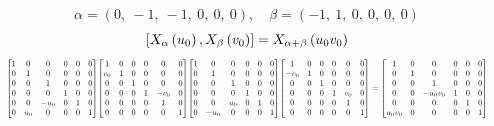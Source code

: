 \documentclass[11pt]{article}
\theoremstyle{definition}
\begin{document}
\[
\alpha = \left( 0, \  -1, \  -1, \  0, \  0, \  0\right), \quad \beta = \left( -1, \  1, \  0, \  0, \  0, \  0\right)
\]
\[
\scaletoalign{\textwidth}{\left[ X_{\alpha}\left(u_{0}\right), X_{\beta}\left(v_{0}\right) \right] = X_{\alpha + \beta}\left(u_{0} v_{0}\right)}
\]
\[
\scaletoalign{\textwidth}{{\left[\begin{matrix}1 & 0 & 0 & 0 & 0 & 0\\0 & 1 & 0 & 0 & 0 & 0\\0 & 0 & 1 & 0 & 0 & 0\\0 & 0 & 0 & 1 & 0 & 0\\0 & 0 & - u_{0} & 0 & 1 & 0\\0 & u_{0} & 0 & 0 & 0 & 1\end{matrix}\right]} {\left[\begin{matrix}1 & 0 & 0 & 0 & 0 & 0\\v_{0} & 1 & 0 & 0 & 0 & 0\\0 & 0 & 1 & 0 & 0 & 0\\0 & 0 & 0 & 1 & - v_{0} & 0\\0 & 0 & 0 & 0 & 1 & 0\\0 & 0 & 0 & 0 & 0 & 1\end{matrix}\right]} {\left[\begin{matrix}1 & 0 & 0 & 0 & 0 & 0\\0 & 1 & 0 & 0 & 0 & 0\\0 & 0 & 1 & 0 & 0 & 0\\0 & 0 & 0 & 1 & 0 & 0\\0 & 0 & u_{0} & 0 & 1 & 0\\0 & - u_{0} & 0 & 0 & 0 & 1\end{matrix}\right]} {\left[\begin{matrix}1 & 0 & 0 & 0 & 0 & 0\\- v_{0} & 1 & 0 & 0 & 0 & 0\\0 & 0 & 1 & 0 & 0 & 0\\0 & 0 & 0 & 1 & v_{0} & 0\\0 & 0 & 0 & 0 & 1 & 0\\0 & 0 & 0 & 0 & 0 & 1\end{matrix}\right]} = {\left[\begin{matrix}1 & 0 & 0 & 0 & 0 & 0\\0 & 1 & 0 & 0 & 0 & 0\\0 & 0 & 1 & 0 & 0 & 0\\0 & 0 & - u_{0} v_{0} & 1 & 0 & 0\\0 & 0 & 0 & 0 & 1 & 0\\u_{0} v_{0} & 0 & 0 & 0 & 0 & 1\end{matrix}\right]}}
\]
\end{document}
